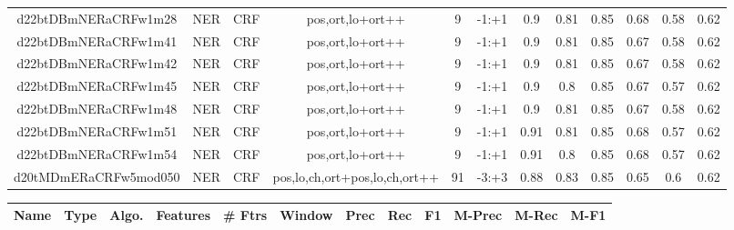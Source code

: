 \documentclass[a4paper]{article}
\begin{document}
\begin{landscape}
\begin{center}
\begin{tabular}{ |c|c|c|c|c|c|c|c|c|c|c|c|}
 
 	
 	\small{ d22btDBmNERaCRFw1m28 } & \small{ NER} & \small{  CRF }  & pos,ort,lo+ort++  &  9 &  \small{  -1:+1 }  &  0.9 & 0.81 & 0.85  &  0.68 & 0.58 & 0.62 \\
 	

 
 	
 	\small{ d22btDBmNERaCRFw1m41 } & \small{ NER} & \small{  CRF }  & pos,ort,lo+ort++  &  9 &  \small{  -1:+1 }  &  0.9 & 0.81 & 0.85  &  0.67 & 0.58 & 0.62 \\
 	

 
 	
 	\small{ d22btDBmNERaCRFw1m42 } & \small{ NER} & \small{  CRF }  & pos,ort,lo+ort++  &  9 &  \small{  -1:+1 }  &  0.9 & 0.81 & 0.85  &  0.67 & 0.58 & 0.62 \\
 	

 
 	
 	\small{ d22btDBmNERaCRFw1m45 } & \small{ NER} & \small{  CRF }  & pos,ort,lo+ort++  &  9 &  \small{  -1:+1 }  &  0.9 & 0.8 & 0.85  &  0.67 & 0.57 & 0.62 \\
 	

 
 	
 	\small{ d22btDBmNERaCRFw1m48 } & \small{ NER} & \small{  CRF }  & pos,ort,lo+ort++  &  9 &  \small{  -1:+1 }  &  0.9 & 0.81 & 0.85  &  0.67 & 0.58 & 0.62 \\
 	

 
 	
 	\small{ d22btDBmNERaCRFw1m51 } & \small{ NER} & \small{  CRF }  & pos,ort,lo+ort++  &  9 &  \small{  -1:+1 }  &  0.91 & 0.81 & 0.85  &  0.68 & 0.57 & 0.62 \\
 	

 
 	
 	\small{ d22btDBmNERaCRFw1m54 } & \small{ NER} & \small{  CRF }  & pos,ort,lo+ort++  &  9 &  \small{  -1:+1 }  &  0.91 & 0.8 & 0.85  &  0.68 & 0.57 & 0.62 \\
 	

 
 	
 	\small{ d20tMDmERaCRFw5mod050 } & \small{ NER} & \small{  CRF }  & pos,lo,ch,ort+pos,lo,ch,ort++  &  91 &  \small{  -3:+3 }  &  0.88 & 0.83 & 0.85  &  0.65 & 0.6 & 0.62 \\
 	
 \hline
\end{tabular}
\end{center}




\begin{center}
\begin{tabular}{ |c|c|c|c|c|c|c|c|c|c|c|c|} 
 \hline
 	Name & Type & Algo. & Features & \# Ftrs & Window & Prec & Rec & F1 & M-Prec & M-Rec & M-F1\\
 \hline


\end{tabular}
\end{center}
\end{landscape}
\end{document}

